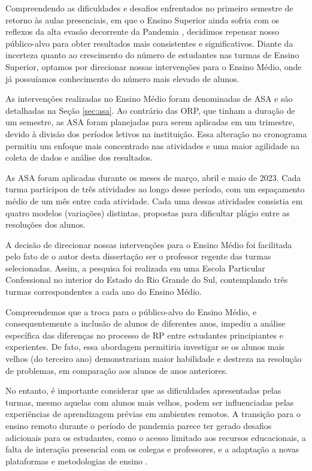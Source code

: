 Compreendendo as dificuldades e desafios enfrentados no primeiro semestre de retorno às aulas presenciais, em que o Ensino Superior ainda sofria com os reflexos da alta evasão decorrente da Pandemia \cite{Palhares2022}, decidimos repensar nosso público-alvo para obter resultados mais consistentes e significativos. Diante da incerteza quanto ao crescimento do número de estudantes nas turmas de Ensino Superior, optamos por direcionar nossas intervenções para o Ensino Médio, onde já possuíamos conhecimento do número mais elevado de alunos.

As intervenções realizadas no Ensino Médio foram denominadas de ASA e são detalhadas na Seção \ref{sec:asa}. Ao contrário das ORP, que tinham a duração de um semestre, as ASA foram planejadas para serem aplicadas em um trimestre, devido à divisão dos períodos letivos na instituição. Essa alteração no cronograma permitiu um enfoque mais concentrado nas atividades e uma maior agilidade na coleta de dados e análise dos resultados. 

As ASA foram aplicadas durante os meses de março, abril e maio de 2023. Cada turma participou de três atividades ao longo desse período, com um espaçamento médio de um mês entre cada atividade. Cada uma dessas atividades consistia em quatro modelos (variações) distintas, propostas para dificultar plágio entre as resoluções dos alunos.

A decisão de direcionar nossas intervenções para o Ensino Médio foi facilitada pelo fato de o autor desta dissertação ser o professor regente das turmas selecionadas. Assim, a pesquisa foi realizada em uma Escola Particular Confessional no interior do Estado do Rio Grande do Sul, contemplando três turmas correspondentes a cada ano do Ensino Médio.

Compreendemos que a troca para o público-alvo do Ensino Médio, e consequentemente a inclusão de alunos de diferentes anos, impediu a análise específica das diferenças no processo de RP entre estudantes principiantes e experientes. De fato, essa abordagem permitiria investigar se os alunos mais velhos (do terceiro ano) demonstrariam maior habilidade e destreza na resolução de problemas, em comparação aos alunos de anos anteriores.

No entanto, é importante considerar que as dificuldades apresentadas pelas turmas, mesmo aquelas com alunos mais velhos, podem ser influenciadas pelas experiências de aprendizagem prévias em ambientes remotos. A transição para o ensino remoto durante o período de pandemia parece ter gerado desafios adicionais para os estudantes, como o acesso limitado aos recursos educacionais, a falta de interação presencial com os colegas e professores, e a adaptação a novas plataformas e metodologias de ensino \cite{Santos_Bastos_Souza_Figueiredo_Teixeira_Quintiliano_2021}.

